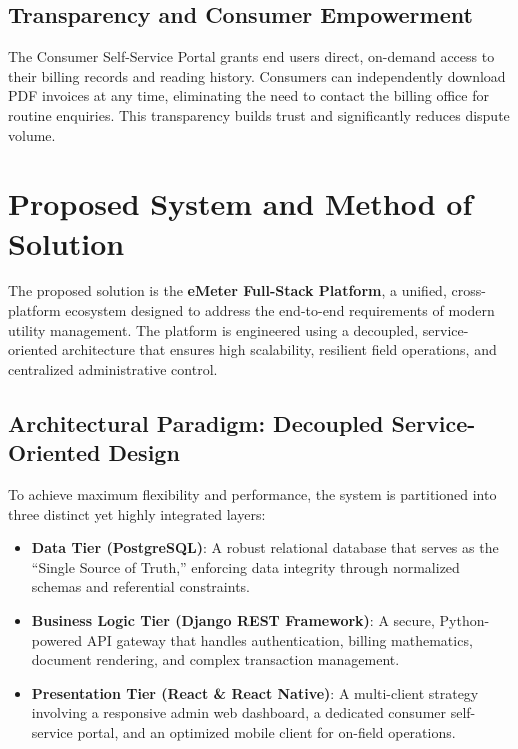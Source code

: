 \documentclass[12pt, a4paper, onecolumn]{report}
\begin{document}
\subsection{Transparency and Consumer Empowerment}
The Consumer Self-Service Portal grants end users direct, on-demand access to their billing records and reading history. Consumers can independently download PDF invoices at any time, eliminating the need to contact the billing office for routine enquiries. This transparency builds trust and significantly reduces dispute volume.

\section{Proposed System and Method of Solution}
The proposed solution is the \textbf{eMeter Full-Stack Platform}, a unified, cross-platform ecosystem designed to address the end-to-end requirements of modern utility management. The platform is engineered using a decoupled, service-oriented architecture that ensures high scalability, resilient field operations, and centralized administrative control.

\subsection{Architectural Paradigm: Decoupled Service-Oriented Design}
To achieve maximum flexibility and performance, the system is partitioned into three distinct yet highly integrated layers:
\begin{itemize}
    \item \textbf{Data Tier (PostgreSQL)}: A robust relational database that serves as the ``Single Source of Truth,'' enforcing data integrity through normalized schemas and referential constraints.
    \item \textbf{Business Logic Tier (Django REST Framework)}: A secure, Python-powered API gateway that handles authentication, billing mathematics, document rendering, and complex transaction management.
    \item \textbf{Presentation Tier (React \& React Native)}: A multi-client strategy involving a responsive admin web dashboard, a dedicated consumer self-service portal, and an optimized mobile client for on-field operations.
\end{itemize}
\end{document}
